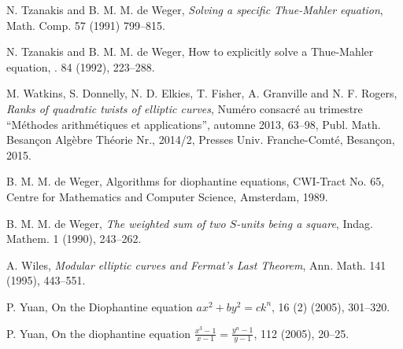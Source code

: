 \begin{thebibliography}{}
N. Tzanakis and B. M. M. de Weger, 
\emph{Solving a specific Thue-Mahler equation},
Math. Comp. 57 (1991) 799--815.

N. Tzanakis and B. M. M. de Weger, 
\newblock How to explicitly solve a Thue-Mahler equation,
. 84 (1992), 223--288.

M. Watkins, S. Donnelly, N. D. Elkies, T. Fisher, A. Granville and N. F. Rogers, 
\emph{Ranks of quadratic twists of elliptic curves},
Num\'ero consacr\'e au trimestre ``M\'ethodes arithm\'etiques et applications'', automne 2013, 63--98, Publ. Math. Besan\c{c}on Alg\`ebre Th\'eorie Nr., 2014/2, Presses Univ. Franche-Comt\'e, Besan\c{c}on, 2015. 

B. M. M. de Weger,
\newblock Algorithms for diophantine equations,
\newblock CWI-Tract No. 65, Centre for Mathematics and Computer Science, Amsterdam, 1989.

B. M. M. de Weger,
\emph{The weighted sum of two $S$-units being a square},
Indag. Mathem. 1 (1990), 243--262.

A. Wiles,
\emph{Modular elliptic curves and Fermat's Last Theorem},
Ann. Math. 141 (1995), 443--551.

P. Yuan,
\newblock On the Diophantine equation $ax^2+by^2=ck^n$,
 16 (2) (2005), 301--320.

P. Yuan,
\newblock On the diophantine equation $\frac{x^3-1}{x-1}=\frac{y^n-1}{y-1}$,
 112 (2005), 20--25.

\end{thebibliography}


\endinput

Any text after an \endinput is ignored.
You could put scraps here or things in progress.

